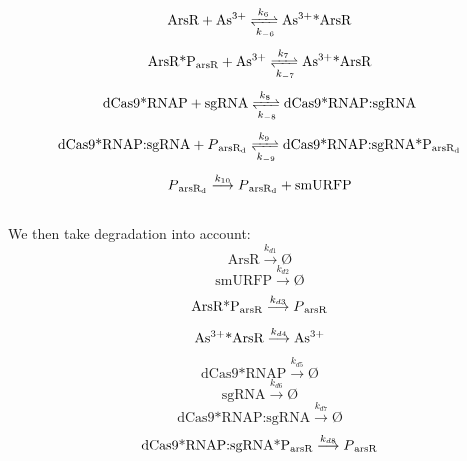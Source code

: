 \begin{equation}
\text{ArsR} +\text{As\textsuperscript{3+}}\xrightleftharpoons[k_{-6}]{k_6}\text{As\textsuperscript{3+}*ArsR}
\end{equation}
\begin{equation}
\text{ArsR*P\textsubscript{arsR}} +\text{As\textsuperscript{3+}}\xrightleftharpoons[k_{-7}]{k_7}\text{As\textsuperscript{3+}*ArsR}
\end{equation}
\begin{equation}
\text{dCas9*RNAP}+\text{sgRNA}\xrightleftharpoons[k_{-8}]{k_8} \text{dCas9*RNAP:sgRNA}
\end{equation}
\begin{equation}
\text{dCas9*RNAP:sgRNA}+P\textsubscript{arsR\textsubscript{d}}\xrightleftharpoons[k_{-9}]{k_9}\text{dCas9*RNAP:sgRNA*P\textsubscript{arsR\textsubscript{d}}}
\end{equation}
\begin{equation}
P\textsubscript{arsR\textsubscript{d}}\stackrel{k_{10}}{\longrightarrow} P\textsubscript{arsR\textsubscript{d}}+\text{smURFP}
\end{equation}
\\
We then take degradation into account:\\
\begin{equation}
\text{ArsR}\stackrel{k_{d1}}{\longrightarrow}Ø
\end{equation}
\begin{equation}
\text{smURFP}\stackrel{k_{d2}}{\longrightarrow}Ø
\end{equation}
\begin{equation}
\text{ArsR*P\textsubscript{arsR}}\stackrel{k_{d3}}{\longrightarrow} P\textsubscript{arsR}
\end{equation}
\begin{equation}
\text{As\textsuperscript{3+}*ArsR} \stackrel{k_{d4}}{\longrightarrow}\text{As\textsuperscript{3+}}
\end{equation}
\begin{equation}
\text{dCas9*RNAP}\stackrel{k_{d5}}{\longrightarrow}Ø
\end{equation}
\begin{equation}
\text{sgRNA}\stackrel{k_{d6}}{\longrightarrow}Ø
\end{equation}
\begin{equation}
\text{dCas9*RNAP:sgRNA}\stackrel{k_{d7}}{\longrightarrow}Ø
\end{equation}
\begin{equation}
\text{dCas9*RNAP:sgRNA*P\textsubscript{arsR}}\stackrel{k_{d8}}{\longrightarrow}P\textsubscript{arsR}
\end{equation}
\\
